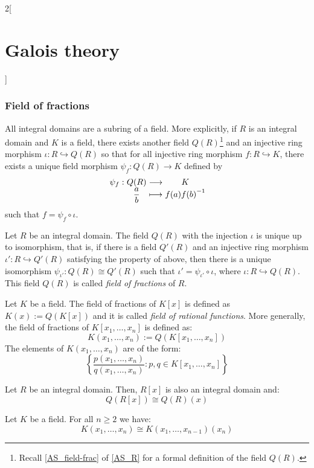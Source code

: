 \documentclass[../../../main.tex]{subfiles}
\begin{document}
\begin{multicols}{2}[\section{Galois theory}]
  \subsubsection{Field of fractions}
  \begin{theorem}
    All integral domains are a subring of a field. More explicitly, if $R$ is an integral domain and $K$ is a field, there exists another field $Q(R)$\footnote{Recall \cref{AS_field-frac} of \cref{AS_R} for a formal definition of the field $Q(R)$.} and an injective ring morphism $\iota:R\hookrightarrow Q(R)$ so that for all injective ring morphism $f:R\hookrightarrow K$, there exists a unique field morphism $\psi_f:Q(R)\rightarrow K$ defined by
    $$
      \function{\psi_f}{Q(R)}{K}{\displaystyle\frac{a}{b}}{f(a){f(b)}^{-1}}
    $$
    such that $f=\psi_f\circ\iota$.
  \end{theorem}
  \begin{corollary}
    Let $R$ be an integral domain. The field $Q(R)$ with the injection $\iota$ is unique up to isomorphism, that is, if there is a field $Q'(R)$ and an injective ring morphism $\iota':R\hookrightarrow Q'(R)$ satisfying the property of above, then there is a unique isomorphism $\psi_{\iota'}:Q(R)\cong Q'(R)$ such that $\iota'=\psi_{\iota'}\circ\iota$, where $\iota:R\hookrightarrow Q(R)$. This field $Q(R)$ is called \emph{field of fractions} of $R$.
  \end{corollary}
  \begin{definition}
    Let $K$ be a field. The field of fractions of $K[x]$ is defined as $K(x):=Q(K[x])$ and it is called \emph{field of rational functions}. More generally, the field of fractions of $K[x_1,\ldots,x_n]$ is defined as: $$K(x_1,\ldots,x_n):=Q(K[x_1,\ldots,x_n])$$ The elements of $K(x_1,\ldots,x_n)$ are of the form: $$\left\{\frac{p(x_1,\ldots,x_n)}{q(x_1,\ldots,x_n)}:p,q\in K[x_1,\ldots,x_n]\right\}$$
  \end{definition}
  \begin{lemma}
    Let $R$ be an integral domain. Then, $R[x]$ is also an integral domain and: $$Q(R[x])\cong Q(R)(x)$$
  \end{lemma}
  \begin{corollary}
    Let $K$ be a field. For all $n\geq 2$ we have: $$K(x_1,\ldots,x_n)\cong K(x_1,\ldots,x_{n-1})(x_n)$$
  \end{corollary}

\end{multicols}
\end{document}
